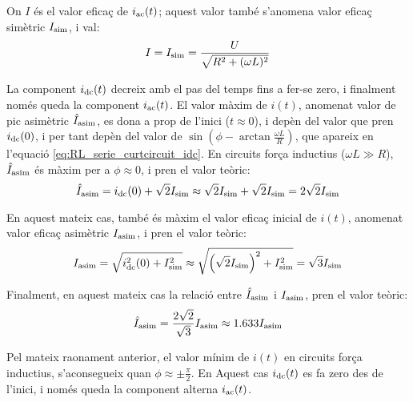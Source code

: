 On $I$ és el valor eficaç de $i_\mathrm{ac}(t)$; aquest valor també s'anomena valor eficaç simètric $I_\mathrm{sim}$, i val:
\begin{equation}
    I = I_\mathrm{sim} =\frac{U}{\sqrt{R^2+(\omega L)^2}}
    \label{eq:RL_serie_curtcircuit_I}
\end{equation}

La component $i_\mathrm{dc}(t)$ decreix amb el pas del temps fins a fer-se zero, i finalment només queda la component $i_\mathrm{ac}(t)$. El valor màxim de $i(t)$, anomenat valor de pic asimètric $\hat{I}_\mathrm{asim}$, es dona a prop de l'inici ($t\approx 0$), i depèn del valor que pren $i_\mathrm{dc}(0)$, i per tant depèn del valor de $\sin\left(\phi - \arctan\frac{\omega L}{R}\right)$, que apareix en l'equació \eqref{eq:RL_serie_curtcircuit_idc}. En circuits força inductius ($\omega L\gg R$), $\hat{I}_\mathrm{asim}$ és màxim per a $\phi \approx 0$, i pren el valor teòric:
\begin{equation}
    \hat{I}_\mathrm{asim} = i_\mathrm{dc}(0) + \sqrt{2} I_\mathrm{sim} \approx \sqrt{2} I_\mathrm{sim} +\sqrt{2} I_\mathrm{sim} =2 \sqrt{2} I_\mathrm{sim}    \label{eq:I_asim_pic}
\end{equation}


En aquest mateix cas, també és màxim el valor eficaç inicial de $i(t)$, anomenat valor eficaç asimètric $I_\mathrm{asim}$,  i pren el valor teòric:
\begin{equation}
    I_\mathrm{asim} = \sqrt{i_\mathrm{dc}^2(0) + I_\mathrm{sim}^2} \approx \sqrt{\left(\sqrt{2}I_\mathrm{sim}\right)^2 + I_\mathrm{sim}^2} = \sqrt{3} I_\mathrm{sim} \label{eq:I_asim_eff}
\end{equation}

Finalment, en aquest mateix cas la relació entre $\hat{I}_\mathrm{asim}$ i $I_\mathrm{asim}$,   pren el valor teòric:
\begin{equation}
    \hat{I}_\mathrm{asim} = \frac{2\sqrt{2}}{\sqrt{3}} I_\mathrm{asim} \approx
    \num{1,633} I_\mathrm{asim}
\end{equation}

Pel mateix raonament anterior, el valor mínim de $i(t)$ en circuits força inductius, s'aconsegueix quan $\phi \approx \pm\frac{\pi}{2}$. En Aquest cas $i_\mathrm{dc}(t)$ es fa zero des de l'inici, i només queda la component alterna $i_\mathrm{ac}(t)$.


